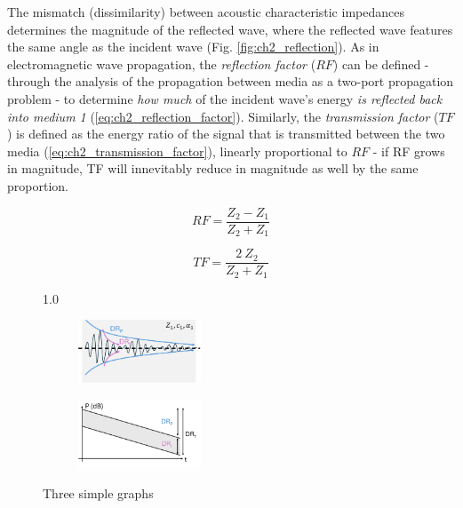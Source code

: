 The mismatch (dissimilarity) 
between acoustic characteristic impedances determines the magnitude of the reflected wave, 
where the reflected wave features the same angle as the incident wave (Fig. \ref{fig:ch2_reflection}). 
As in electromagnetic wave propagation, the \textit{reflection factor} ($RF$) can be defined - through the 
analysis of the propagation between media as a two-port propagation problem - to determine \textit{how much} 
of the incident wave's energy \textit{is reflected back into medium 1} (\ref{eq:ch2_reflection_factor}). 
Similarly, the \textit{transmission factor} ($TF$) is defined as the energy ratio of the signal that is 
transmitted between the two media (\ref{eq:ch2_transmission_factor}), linearly proportional to $RF$ - if RF grows in 
magnitude, TF will innevitably reduce in magnitude as well by the same proportion.

\begin{equation}
  RF = \frac{Z_2 - Z_1}{Z_2 + Z_1}
  \label{eq:ch2_reflection_factor}
\end{equation}

\begin{equation}
  TF = \frac{2 \ Z_2}{Z_2 + Z_1}
  \label{eq:ch2_transmission_factor}
\end{equation}

\begin{figure}[h]{1.0\textwidth}
    \centering
  \begin{subfigure}[b]{0.4\textwidth}
      \centering
      \includegraphics[width=0.4\textwidth]{Chapters/Figures/Ch2_UltrasoundFundamentals/attenuation.pdf}
      \label{fig:ch2_attenuation}
  \end{subfigure}
  \hfill
  \begin{subfigure}[b]{0.4\textwidth}
      \centering
      \includegraphics[width=0.4\textwidth]{Chapters/Figures/Ch2_UltrasoundFundamentals/dynamic_range.pdf}
      \label{fig:ch2_dynamic_range}
  \end{subfigure}
     \caption{Three simple graphs}
     \label{fig:ch2_elastic_waves}
\end{figure}

